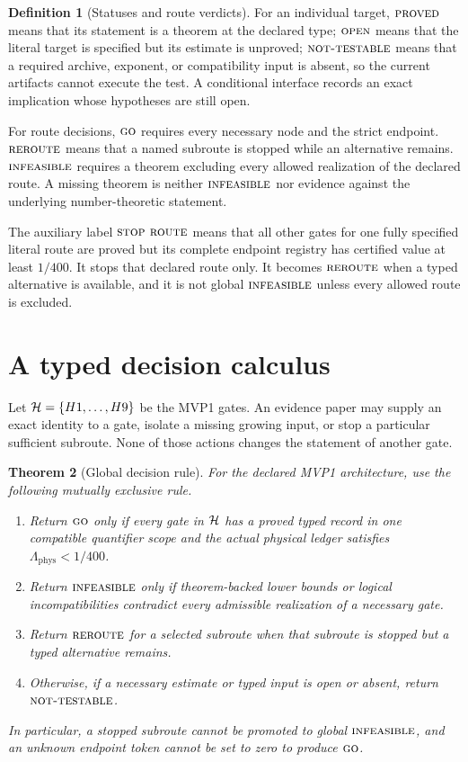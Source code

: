 \documentclass[11pt,a4paper]{article}
\newtheorem{theorem}{Theorem}[section]
\theoremstyle{definition}
\newtheorem{definition}[theorem]{Definition}
\theoremstyle{remark}
\newcommand{\Lam}{\Lambda_{\mathrm{phys}}}
\newcommand{\GO}{\textnormal{\textsc{go}}}
\newcommand{\RE}{\textnormal{\textsc{reroute}}}
\newcommand{\INF}{\textnormal{\textsc{infeasible}}}
\newcommand{\NT}{\textnormal{\textsc{not-testable}}}
\newcommand{\OPEN}{\textnormal{\textsc{open}}}
\newcommand{\PROVED}{\textnormal{\textsc{proved}}}
\begin{document}
\begin{definition}[Statuses and route verdicts]
\label{def:verdicts}
For an individual target, \(\PROVED\) means that its statement is a
theorem at the declared type; \(\OPEN\) means that the literal target
is specified but its estimate is unproved; \(\NT\) means that a
required archive, exponent, or compatibility input is absent, so the
current artifacts cannot execute the test.  A conditional interface
records an exact implication whose hypotheses are still open.

For route decisions, \(\GO\) requires every necessary node and the
strict endpoint.  \(\RE\) means that a named subroute is stopped while
an alternative remains.  \(\INF\) requires a theorem excluding every
allowed realization of the declared route.  A missing theorem is
neither \(\INF\) nor evidence against the underlying number-theoretic
statement.

The auxiliary label \(\textsc{stop route}\) means that all other gates
for one fully specified literal route are proved but its complete
endpoint registry has certified value at least \(1/400\).  It stops
that declared route only.  It becomes \(\RE\) when a typed alternative
is available, and it is not global \(\INF\) unless every allowed route
is excluded.
\end{definition}

\section{A typed decision calculus}

Let \({\cal H}=\{H1,\ldots,H9\}\) be the MVP1 gates.  An evidence
paper may supply an exact identity to a gate, isolate a missing
growing input, or stop a particular sufficient subroute.  None of
those actions changes the statement of another gate.

\begin{theorem}[Global decision rule]
\label{thm:decision}
For the declared MVP1 architecture, use the following mutually
exclusive rule.
\begin{enumerate}[label=(\roman*),leftmargin=2.2em]
\item Return \(\GO\) only if every gate in \({\cal H}\) has a proved
  typed record in one compatible quantifier scope and the actual
  physical ledger satisfies \(\Lam<1/400\).
\item Return \(\INF\) only if theorem-backed lower bounds or logical
  incompatibilities contradict every admissible realization of a
  necessary gate.
\item Return \(\RE\) for a selected subroute when that subroute is
  stopped but a typed alternative remains.
\item Otherwise, if a necessary estimate or typed input is open or
  absent, return \(\NT\).
\end{enumerate}
In particular, a stopped subroute cannot be promoted to global
\(\INF\), and an unknown endpoint token cannot be set to zero to
produce \(\GO\).
\end{theorem}
\end{document}
